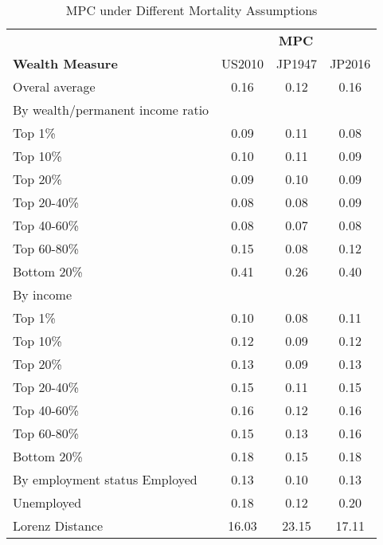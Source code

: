 \documentclass[11pt]{article}
\begin{document}
\begin{table} 
\centering 
\caption{MPC under Different Mortality Assumptions} %
\begin{tabular}{l c c c} %
\toprule %
& \multicolumn{3}{c}{\textbf{MPC}} \\ %
\cmidrule(l){2-4} %
\textbf{Wealth Measure} & US2010 & JP1947 & JP2016 \\ %
\midrule %
Overal average & 0.16  & 0.12 & 0.16  \\ 
\midrule %
By wealth/permanent income ratio \\ 
 Top 1\% & 0.09 & 0.11 & 0.08 \\ 
 Top 10\% & 0.10 & 0.11 & 0.09 \\ 
 Top 20\% & 0.09 & 0.10 & 0.09 \\ 
 Top 20-40\% & 0.08 & 0.08 & 0.09 \\ 
 Top 40-60\% & 0.08 & 0.07 & 0.08 \\ 
 Top 60-80\% & 0.15 & 0.08 & 0.12 \\ 
 Bottom 20\% & 0.41 & 0.26 & 0.40 \\ 
\midrule %
By income \\ 
 Top 1\% & 0.10 & 0.08 & 0.11 \\ 
 Top 10\% & 0.12 & 0.09 & 0.12 \\ 
 Top 20\% & 0.13 & 0.09 & 0.13 \\ 
 Top 20-40\% & 0.15 & 0.11 & 0.15 \\ 
 Top 40-60\% & 0.16 & 0.12 & 0.16 \\ 
 Top 60-80\% & 0.15 & 0.13 & 0.16 \\ 
 Bottom 20\% & 0.18 & 0.15 & 0.18 \\ 
\midrule %
By employment status
 Employed & 0.13 & 0.10 & 0.13  \\ 
 Unemployed & 0.18 & 0.12 & 0.20 \\ 
\midrule %
 Lorenz Distance & 16.03 & 23.15 & 17.11  \\ 
\bottomrule %
\end{tabular}

\label{tab:template} %
\end{table}
\end{document}
